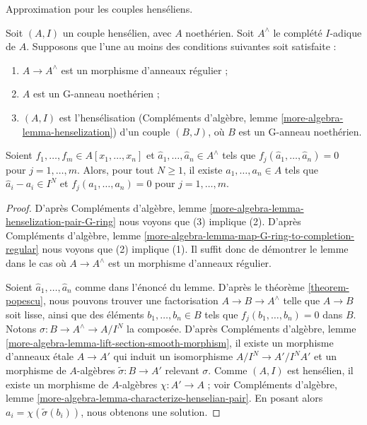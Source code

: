 \begin{lemma}
\label{lemma-henselian-pair}
\begin{slogan}
Approximation pour les couples henséliens.
\end{slogan}
Soit $(A, I)$ un couple hensélien, avec $A$ noethérien.
Soit $A^\wedge$ le complété $I$-adique de $A$. Supposons que l'une au
moins des conditions suivantes soit satisfaite :
\begin{enumerate}
\item $A \to A^\wedge$ est un morphisme d'anneaux régulier ;
\item $A$ est un G-anneau noethérien ;
\item $(A, I)$ est l'hensélisation
(Compléments d'algèbre, lemme \ref{more-algebra-lemma-henselization})
d'un couple $(B, J)$, où $B$ est un G-anneau noethérien.
\end{enumerate}
Soient $f_1, \ldots, f_m \in A[x_1, \ldots, x_n]$
et $\hat{a}_1, \ldots, \hat{a}_n \in A^\wedge$ tels que
$f_j(\hat{a}_1, \ldots, \hat{a}_n) = 0$
pour $j = 1, \ldots, m$. Alors, pour tout $N \geq 1$, il existe
$a_1, \ldots, a_n \in A$ tels que
$\hat{a}_i - a_i \in I^N$ et $f_j(a_1, \ldots, a_n) = 0$
pour $j = 1, \ldots, m$.
\end{lemma}

\begin{proof}
D'après Compléments d'algèbre, lemme
\ref{more-algebra-lemma-henselization-pair-G-ring}
nous voyons que (3) implique (2). D'après Compléments d'algèbre, lemme
\ref{more-algebra-lemma-map-G-ring-to-completion-regular}
nous voyons que (2) implique (1). Il suffit donc de démontrer le lemme
dans le cas où $A \to A^\wedge$ est un morphisme d'anneaux régulier.

\medskip\noindent
Soient $\hat{a}_1, \ldots, \hat{a}_n$ comme dans l'énoncé du lemme.
D'après le théorème \ref{theorem-popescu}, nous pouvons trouver une
factorisation $A \to B \to A^\wedge$ telle que $A \to B$ soit lisse, ainsi que
des éléments $b_1, \ldots, b_n \in B$ tels que
$f_j(b_1, \ldots, b_n) = 0$ dans $B$.
Notons $\sigma : B \to A^\wedge \to A/I^N$ la composée.
D'après Compléments d'algèbre, lemme
\ref{more-algebra-lemma-lift-section-smooth-morphism}, il existe un morphisme
d'anneaux \'etale $A \to A'$ qui induit un isomorphisme
$A/I^N \to A'/I^NA'$ et un morphisme de $A$-algèbres
$\tilde \sigma : B \to A'$ relevant $\sigma$.
Comme $(A, I)$ est hensélien, il existe un morphisme de $A$-algèbres
$\chi : A' \to A$ ; voir Compléments d'algèbre, lemme
\ref{more-algebra-lemma-characterize-henselian-pair}.
En posant alors $a_i = \chi(\tilde \sigma(b_i))$, nous obtenons une solution.
\end{proof}









